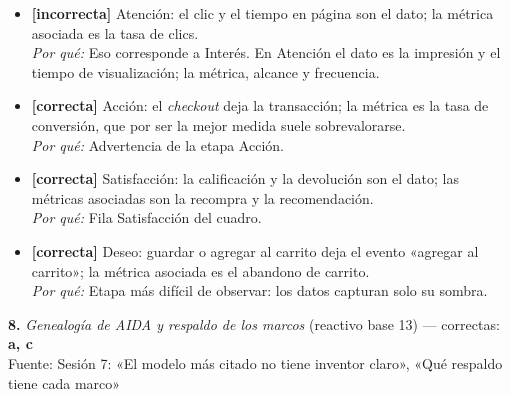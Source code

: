 \documentclass[10pt,letterpaper]{article}
\begin{document}
\begin{itemize}[leftmargin=1.2em,itemsep=0pt,topsep=1pt,parsep=0pt]
\item[\textbf{a)}] {\footnotesize \textbf{[incorrecta]} Atención: el clic y el tiempo en página son el dato; la métrica asociada es la tasa de clics.\\ \textit{Por qué:} Eso corresponde a Interés. En Atención el dato es la impresión y el tiempo de visualización; la métrica, alcance y frecuencia.}
\item[\textbf{b)}] {\footnotesize \textbf{[correcta]} Acción: el \textit{checkout} deja la transacción; la métrica es la tasa de conversión, que por ser la mejor medida suele sobrevalorarse.\\ \textit{Por qué:} Advertencia de la etapa Acción.}
\item[\textbf{c)}] {\footnotesize \textbf{[correcta]} Satisfacción: la calificación y la devolución son el dato; las métricas asociadas son la recompra y la recomendación.\\ \textit{Por qué:} Fila Satisfacción del cuadro.}
\item[\textbf{d)}] {\footnotesize \textbf{[correcta]} Deseo: guardar o agregar al carrito deja el evento «agregar al carrito»; la métrica asociada es el abandono de carrito.\\ \textit{Por qué:} Etapa más difícil de observar: los datos capturan solo su sombra.}
\end{itemize}
\vspace{3pt}\noindent\textbf{8.} \textit{Genealogía de AIDA y respaldo de los marcos} (reactivo base 13) — correctas: \textbf{a, c}\\[-1pt]
{\scriptsize Fuente: Sesión 7: «El modelo más citado no tiene inventor claro», «Qué respaldo tiene cada marco»}
\end{document}
